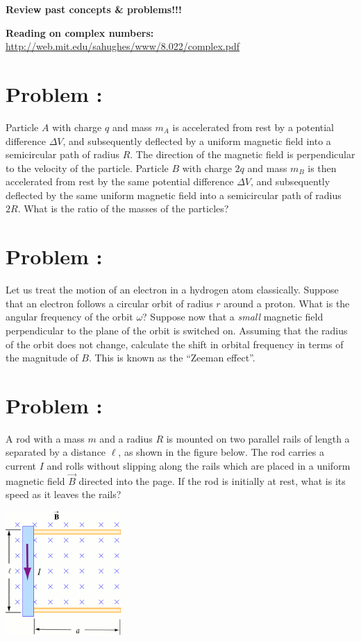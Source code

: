 \documentclass[problems]{esg8022pset}
\date{\today }
\begin{document}
  \noindent \textbf{Review past concepts \& problems!!!}

  \noindent \textbf{Reading on complex numbers:} \url{http://web.mit.edu/sahughes/www/8.022/complex.pdf}
\section{Problem \thesection: }
  Particle $A$ with charge $q$ and mass $m_A$ is accelerated from rest by a potential difference $\Delta V$, and subsequently deflected by a uniform magnetic field into a semicircular path of radius $R$.  The direction of the magnetic field is perpendicular to the velocity of the particle.  Particle $B$ with charge $2q$ and mass $m_B$ is then accelerated from rest by the same potential difference $\Delta V$, and subsequently deflected by the same uniform magnetic field into a semicircular path of radius $2R$.  What is the ratio of the masses of the particles?
\section{Problem \thesection: }
  Let us treat the motion of an electron in a hydrogen atom classically. Suppose that an electron follows a circular orbit of radius $r$ around a proton. What is the angular frequency of the orbit $\omega$? Suppose now that a \emph{small} magnetic field perpendicular to the plane of the orbit is switched on. Assuming that the radius of the orbit does not change, calculate the shift in orbital frequency in terms of the magnitude of $B$. This is known as the ``Zeeman effect''.
\section{Problem \thesection: }
  A rod with a mass $m$ and a radius $R$ is mounted on two parallel rails of length a separated by a distance $\ell$, as shown in the figure below. The rod carries a current $I$ and rolls without slipping along the rails which are placed in a uniform magnetic field $\vec B$ directed into the page. If the rod is initially at rest, what is its speed as it leaves the rails?
  \begin{center}\includegraphics[width=0.33\textwidth]{ps07_03}\end{center}
\end{document}
